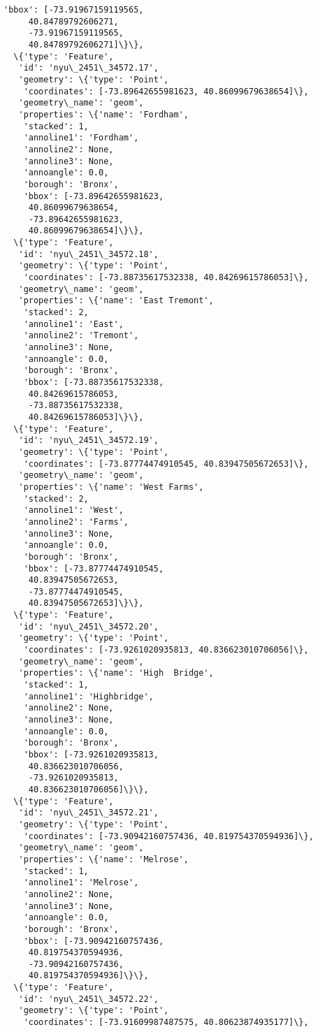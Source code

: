 \documentclass[11pt]{article}
\begin{document}
\begin{tcolorbox}[breakable, size=fbox, boxrule=.5pt, pad at break*=1mm, opacityfill=0]
\begin{Verbatim}[commandchars=\\\{\}]
    'bbox': [-73.91967159119565,
     40.84789792606271,
     -73.91967159119565,
     40.84789792606271]\}\},
  \{'type': 'Feature',
   'id': 'nyu\_2451\_34572.17',
   'geometry': \{'type': 'Point',
    'coordinates': [-73.89642655981623, 40.86099679638654]\},
   'geometry\_name': 'geom',
   'properties': \{'name': 'Fordham',
    'stacked': 1,
    'annoline1': 'Fordham',
    'annoline2': None,
    'annoline3': None,
    'annoangle': 0.0,
    'borough': 'Bronx',
    'bbox': [-73.89642655981623,
     40.86099679638654,
     -73.89642655981623,
     40.86099679638654]\}\},
  \{'type': 'Feature',
   'id': 'nyu\_2451\_34572.18',
   'geometry': \{'type': 'Point',
    'coordinates': [-73.88735617532338, 40.84269615786053]\},
   'geometry\_name': 'geom',
   'properties': \{'name': 'East Tremont',
    'stacked': 2,
    'annoline1': 'East',
    'annoline2': 'Tremont',
    'annoline3': None,
    'annoangle': 0.0,
    'borough': 'Bronx',
    'bbox': [-73.88735617532338,
     40.84269615786053,
     -73.88735617532338,
     40.84269615786053]\}\},
  \{'type': 'Feature',
   'id': 'nyu\_2451\_34572.19',
   'geometry': \{'type': 'Point',
    'coordinates': [-73.87774474910545, 40.83947505672653]\},
   'geometry\_name': 'geom',
   'properties': \{'name': 'West Farms',
    'stacked': 2,
    'annoline1': 'West',
    'annoline2': 'Farms',
    'annoline3': None,
    'annoangle': 0.0,
    'borough': 'Bronx',
    'bbox': [-73.87774474910545,
     40.83947505672653,
     -73.87774474910545,
     40.83947505672653]\}\},
  \{'type': 'Feature',
   'id': 'nyu\_2451\_34572.20',
   'geometry': \{'type': 'Point',
    'coordinates': [-73.9261020935813, 40.836623010706056]\},
   'geometry\_name': 'geom',
   'properties': \{'name': 'High  Bridge',
    'stacked': 1,
    'annoline1': 'Highbridge',
    'annoline2': None,
    'annoline3': None,
    'annoangle': 0.0,
    'borough': 'Bronx',
    'bbox': [-73.9261020935813,
     40.836623010706056,
     -73.9261020935813,
     40.836623010706056]\}\},
  \{'type': 'Feature',
   'id': 'nyu\_2451\_34572.21',
   'geometry': \{'type': 'Point',
    'coordinates': [-73.90942160757436, 40.819754370594936]\},
   'geometry\_name': 'geom',
   'properties': \{'name': 'Melrose',
    'stacked': 1,
    'annoline1': 'Melrose',
    'annoline2': None,
    'annoline3': None,
    'annoangle': 0.0,
    'borough': 'Bronx',
    'bbox': [-73.90942160757436,
     40.819754370594936,
     -73.90942160757436,
     40.819754370594936]\}\},
  \{'type': 'Feature',
   'id': 'nyu\_2451\_34572.22',
   'geometry': \{'type': 'Point',
    'coordinates': [-73.91609987487575, 40.80623874935177]\},

\end{Verbatim}
\end{tcolorbox}
\end{document}
